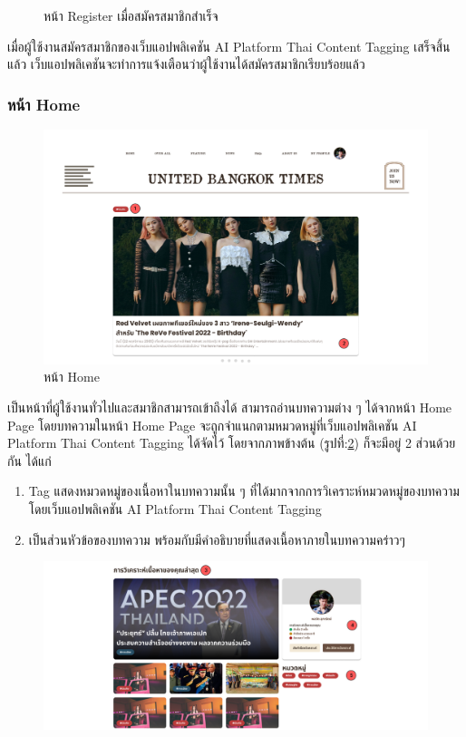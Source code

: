 \documentclass[12pt,oneside,openright,a4paper]{cpe-thai-project}
\begin{document}
\begin{itemize}
\begin{figure}[!ht]
  \caption{หน้า Register เมื่อสมัครสมาชิกสำเร็จ}\label{fig:register_already} 
\end{figure}
\hspace*{1cm}เมื่อผู้ใช้งานสมัครสมาชิกของเว็บแอปพลิเคชัน AI Platform Thai Content Tagging เสร็จสิ้นแล้ว 
เว็บแอปพลิเคชันจะทำการแจ้งเตือนว่าผู้ใช้งานได้สมัครสมาชิกเรียบร้อยแล้ว

\subsubsection{หน้า Home}
\begin{figure}[!ht]\centering
  \includegraphics[width=15cm]{./img/project_ui/homepage2.png} 
  \caption{หน้า Home}\label{fig:homepage} 
\end{figure}
\hspace*{1cm}เป็นหน้าที่ผู้ใช้งานทั่วไปและสมาชิกสามารถเข้าถึงได้ สามารถอ่านบทความต่าง ๆ ได้จากหน้า Home Page 
โดยบทความในหน้า Home Page จะถูกจำแนกตามหมวดหมู่ที่เว็บแอปพลิเคชัน AI Platform Thai Content Tagging ได้จัดไว้ \newpage
โดยจากภาพข้างต้น (รูปที่:\ref{fig:homepage}) ก็จะมีอยู่ 2 ส่วนด้วยกัน ได้แก่
\begin{enumerate}
  \item Tag แสดงหมวดหมู่ของเนื้อหาในบทความนั้น ๆ ที่ได้มากจากการวิเคราะห์หมวดหมู่ของบทความโดยเว็บแอปพลิเคชัน AI Platform Thai Content Tagging
  \item เป็นส่วนหัวข้อของบทความ พร้อมกับมีคำอธิบายที่แสดงเนื้อหาภายในบทความคร่าวๆ
\end{enumerate}
\begin{figure}[!ht]\centering
  \includegraphics[width=14cm]{./img/project_ui/homepage3.png} 

\end{figure}
\end{itemize}
\end{document}
